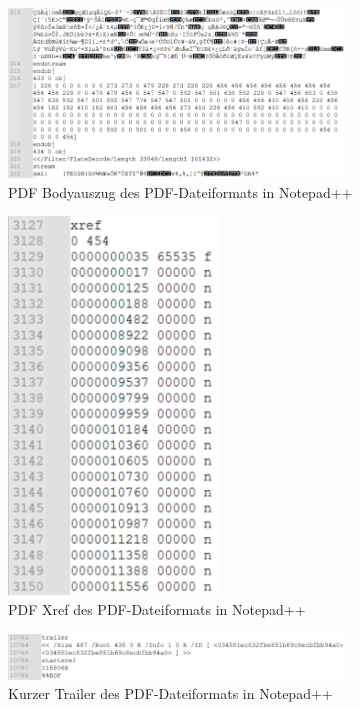 \begin{figure}[!htb]
	\centering
	\includegraphics[width=0.8\textwidth]{"images/pdf_body2-notepad.png"}
	\caption{PDF Bodyauszug des PDF-Dateiformats in Notepad++}
	\label{fig:body}
\end{figure}

\begin{figure}[!htb]
	\centering
	\includegraphics[width=0.5\textwidth]{"images/pdf_xref_start-notepad.png"}
	\caption{PDF Xref des PDF-Dateiformats in Notepad++}
	\label{fig:xref}
\end{figure}

\begin{figure}[!htb]
	\centering
	\includegraphics[width=0.8\textwidth]{"images/pdf_trailer-notepad.png"}
	\caption{Kurzer Trailer des PDF-Dateiformats in Notepad++}
	\label{fig:trailer1}
\end{figure}

